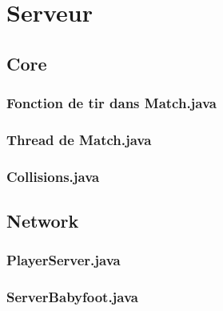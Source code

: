 \chapter{Serveur}
	\section{Core}
        \subsection{Fonction de tir dans Match.java}
            
        \subsection{Thread de Match.java}
            
        \subsection{Collisions.java}
            
    \section{Network}
        \subsection{PlayerServer.java}
            
        \subsection{ServerBabyfoot.java}
            

